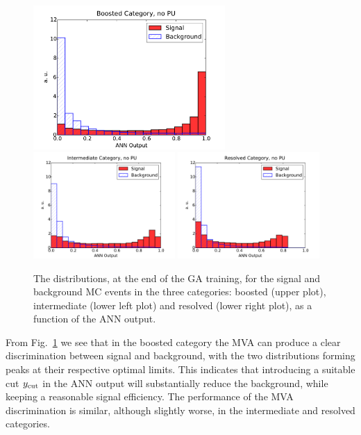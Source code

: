 \begin{figure}[t]
\begin{center}
\includegraphics[width=0.65\textwidth]{plots/Boosted_disc_noPU.pdf}
\includegraphics[width=0.48\textwidth]{plots/Intermediate_disc_noPU.pdf}
\includegraphics[width=0.48\textwidth]{plots/Resolved_disc_noPU.pdf}
\caption{\small The distributions, at the end of the
  GA training, 
  for the signal and background MC events in the three categories:
  boosted (upper plot), intermediate (lower left plot) and
  resolved (lower right plot), as a function of the ANN output.
}
\label{fig:nnresponse}
\end{center}
\end{figure}

From Fig.~\ref{fig:nnresponse} we see that in the boosted category the MVA can produce
a clear discrimination between signal and background, with the two distributions
forming peaks at their respective optimal limits.
%
This indicates that introducing a suitable cut
$y_{\rm cut}$
in the ANN output will substantially reduce the background,
while keeping a reasonable signal efficiency.
%
The performance of the MVA discrimination is similar,
although slightly worse, in the intermediate
and resolved categories.


